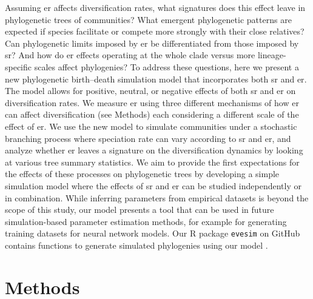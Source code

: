 {Assuming \acrshort{er} affects diversification rates, what signatures does this effect leave in phylogenetic trees of communities? What emergent phylogenetic patterns are expected if species facilitate or compete more strongly with their close relatives? Can phylogenetic limits imposed by \acrshort{er} be differentiated from those imposed by \acrshort{sr}? And how do \acrshort{er} effects operating at the whole clade versus more lineage-specific scales affect phylogenies? To address these questions, here we present a new phylogenetic birth--death simulation model that incorporates both \acrshort{sr} and \acrshort{er}. The model allows for positive, neutral, or negative effects of both \acrshort{sr} and \acrshort{er} on diversification rates. We measure \acrshort{er} using three different mechanisms of how \acrshort{er} can affect diversification (see Methods) each considering a different scale of the effect of \acrshort{er}. We use the new model to simulate communities under a stochastic branching process where speciation rate can vary according to \acrshort{sr} and \acrshort{er}, and analyze whether \acrshort{er} leaves a signature on the diversification dynamics by looking at various tree summary statistics. We aim to provide the first expectations for the effects of these processes on phylogenetic trees by developing a simple simulation model where the effects of \acrshort{sr} and \acrshort{er} can be studied independently or in combination. While inferring parameters from empirical datasets is beyond the scope of this study, our model presents a tool that can be used in future simulation-based parameter estimation methods, for example for generating training datasets for neural network models. Our R package \texttt{evesim} on GitHub contains functions to generate simulated phylogenies using our model \citep{hildenbrandt_evesim_2024}.

\section{Methods}
\label{ch1::sec::methods}

}
